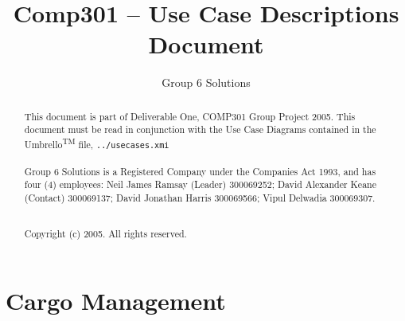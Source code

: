 \documentclass[a4paper,10pt]{report}
\title{Comp301 -- Use Case Descriptions Document}
\author{Group 6 Solutions}
\begin{document}
\maketitle
\tableofcontents

\begin{abstract}
This document is part of Deliverable One, COMP301 Group Project 2005. This document must be read in conjunction with the Use Case Diagrams contained in the Umbrello\textsuperscript{TM} file, \verb+../usecases.xmi+ \\ \\Group 6 Solutions is a Registered Company under the Companies Act 1993, and has four (4) employees: Neil James Ramsay (Leader) 300069252; David Alexander Keane (Contact) 300069137; David Jonathan Harris 300069566; Vipul Delwadia 300069307. \\ \\\centerline{Copyright (c) 2005. All rights reserved.}
\end{abstract}

\chapter{Cargo Management}
\end{document}
